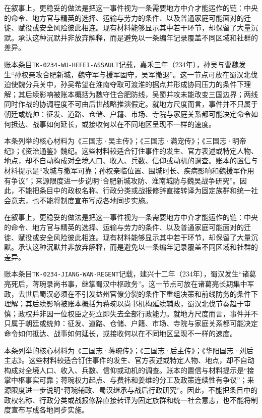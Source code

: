 在叙事上，更稳妥的做法是把这一事件视为一条需要地方中介才能运作的链：中央的命令、地方官与精英的选择、运输与劳力的条件、以及普通家庭可能面对的迁徙、赋役或安全风险彼此相连。现有材料能够显示其中若干环节，却保留了大量沉默。承认这种沉默并非放弃解释，而是避免以一条编年记录覆盖不同区域和社群的差异。

账本条目\texttt{TK-0234-WU-HEFEI-ASSAULT}记载，嘉禾三年（234年），孙吴与曹魏发生“孙权亲攻合肥新城，魏守军与援军固守，吴军撤退”。这一节点可放在蜀汉北伐迫使魏分兵关中，孙吴希望在淮南夺取可渡淮的据点并形成协同压力的条件下理解；其后续影响被账本概括为魏守住合肥防线，吴蜀并攻未能改变三国边界；两线同时作战的协调程度不可由后世战略推演假定。就地方尺度而言，事件并不只属于朝廷或统帅：征发、道路、仓储、户籍、市场、寺院与家庭关系都可能决定命令如何抵达、战事如何延长，或接收何以在不同地区呈现不一样的速度。

本条列举的核心材料为《三国志·吴主传》；《三国志·满宠传》；《三国志·明帝纪》；《资治通鉴》魏纪。这些材料较适合钉住事件的发生、官方表述或特定人物、地点，却不自动构成对全境人口、收入、兵数、信仰或动机的调查。账本的置信与材料提示是“攻城与撤军可靠；孙权亲临位置、围城时长、疾病影响和魏援军作用有争议”；来源限度进一步说明“合肥新城攻防、淮南城防与魏吴战争研究”。因此，不能把条目中的政权名称、行政分类或战报修辞直接转译为固定族群和统一社会意志，也不能将制度宣布写成各地同步实施。

在叙事上，更稳妥的做法是把这一事件视为一条需要地方中介才能运作的链：中央的命令、地方官与精英的选择、运输与劳力的条件、以及普通家庭可能面对的迁徙、赋役或安全风险彼此相连。现有材料能够显示其中若干环节，却保留了大量沉默。承认这种沉默并非放弃解释，而是避免以一条编年记录覆盖不同区域和社群的差异。

账本条目\texttt{TK-0234-JIANG-WAN-REGENT}记载，建兴十二年（234年），蜀汉发生“诸葛亮死后，蒋琬录尚书事，继掌蜀汉中枢政务”。这一节点可放在诸葛亮长期集中军政，去世后蜀汉必须在不引发益州官僚分裂的条件下重组决策和前线防务的条件下理解；其后续影响被账本概括为蒋琬以尚书机构延续辅政，蜀汉北伐节奏趋于审慎；政权并非因一位权臣之死立即失去全部行政能力。就地方尺度而言，事件并不只属于朝廷或统帅：征发、道路、仓储、户籍、市场、寺院与家庭关系都可能决定命令如何抵达、战事如何延长，或接收何以在不同地区呈现不一样的速度。

本条列举的核心材料为《三国志·蒋琬传》；《三国志·后主传》；《华阳国志·刘后主志》。这些材料较适合钉住事件的发生、官方表述或特定人物、地点，却不自动构成对全境人口、收入、兵数、信仰或动机的调查。账本的置信与材料提示是“接掌中枢事实可靠；蒋琬权力起点、与费祎和姜维的分工及政策连续性有争议”；来源限度进一步说明“蒋琬辅政、蜀汉继承与战后行政研究”。因此，不能把条目中的政权名称、行政分类或战报修辞直接转译为固定族群和统一社会意志，也不能将制度宣布写成各地同步实施。

